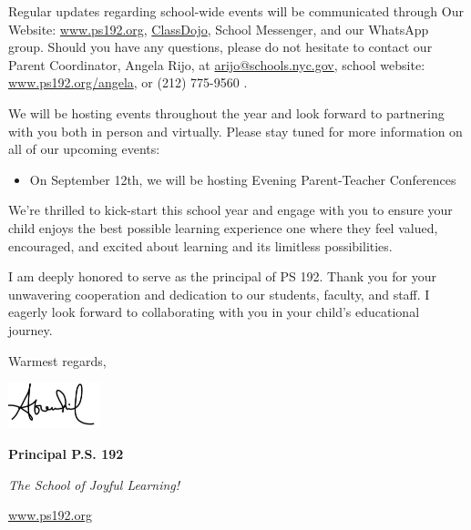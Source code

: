 \documentclass[12pt,letterpaper]{article}
\begin{document}
Regular updates regarding school-wide events will be communicated through Our Website:
\url{www.ps192.org}, \href{https://www.classdojo.com/}{ClassDojo}, School Messenger, and our WhatsApp group. Should you
have any questions, please do not hesitate to contact our Parent Coordinator, Angela
Rijo, at \href{mailto:arijo@schools.nyc.gov}{arijo@schools.nyc.gov}, school website: \href{https://www.ps192.org/angela}{www.ps192.org/angela}, or (212) 775-9560 .
\pagebreak
\vspace*{1cm}

We will be hosting events throughout the year and look forward to partnering with you both
in person and virtually. Please stay tuned for more information on all of our upcoming
events:
	\begin{itemize}
	\item On September 12th, we will be hosting Evening Parent-Teacher Conferences
	\end{itemize}
 
We're thrilled to kick-start this school year and engage with you to ensure your child
enjoys the best possible learning experience one where they feel valued, encouraged, and
excited about learning and its limitless possibilities.

I am deeply honored to serve as the principal of PS 192. Thank you for your unwavering
cooperation and dedication to our students, faculty, and staff. I eagerly look forward to
collaborating with you in your child's educational journey.

Warmest regards,

\includegraphics[width=0.2\textwidth]{hil_signature}

\textbf{Principal P.S. 192}

\textit{The School of Joyful Learning!}

\url{www.ps192.org}
\end{document}
